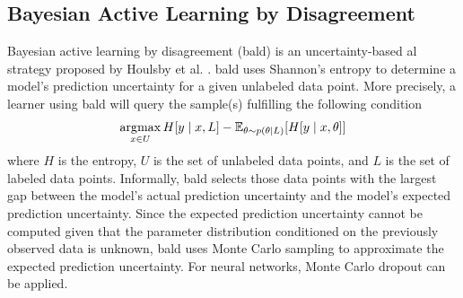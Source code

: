 \subsection{Bayesian Active Learning by Disagreement}
\label{sec:Related_work:Active_Learning:BALD}
Bayesian active learning by disagreement (\gls{bald}) is an uncertainty-based \gls{al} strategy proposed by Houlsby et al. 
\cite{houlsby2011bayesian}. \gls{bald} uses Shannon's entropy \cite{cover1991information} to determine a model's prediction uncertainty for a given
unlabeled data point. More precisely, a learner using \gls{bald} will query the sample(s) fulfilling the following condition
\begin{equation}
    \operatorname*{\arg\!\max}_{x \in U} H[y \mid x, L] - \mathbb{E}_{\theta \sim p(\theta \mid L)} [H[y \mid x, \theta]]
\end{equation}
where $H$ is the entropy, $U$ is the set of unlabeled data points, and $L$ is the set of labeled data points.
Informally, \gls{bald} selects those data points with the largest gap between the model's actual prediction uncertainty and the model's expected
prediction uncertainty. Since the expected prediction uncertainty cannot be computed given that the parameter distribution conditioned on the
previously observed data is unknown, \gls{bald} uses Monte Carlo sampling to approximate the expected prediction uncertainty. For neural networks, Monte
Carlo dropout \cite{gal2016dropout} can be applied.

